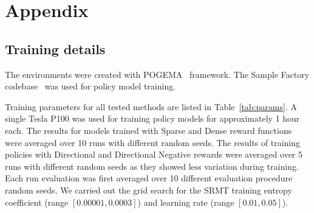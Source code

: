\documentclass{article} %
\begin{document}
\appendix

\section{Appendix}
\label{sec:appendix}

\subsection{Training details}
\label{appdx:train_details}
The environments were created with POGEMA~\citet{skrynnik2024pogema} framework. 
The Sample Factory codebase~\citep{petrenko2020sf} was used for policy model training.

Training parameters for all tested methods are listed in Table~\ref{tab:params}. A single Tesla P100 was used for training policy models for approximately 1 hour each. The results for models trained with Sparse and Dense reward functions were averaged over 10 runs with different random seeds. The results of training policies with Directional and Directional Negative rewards were averaged over 5 runs with different random seeds as they showed less variation during training. Each run evaluation was first averaged over 10 different evaluation procedure random seeds. We carried out the grid search for the SRMT training entropy coefficient (range $[0.00001, 0.0003]$) and learning rate (range $[0.01, 0.05]$).
\end{document}
